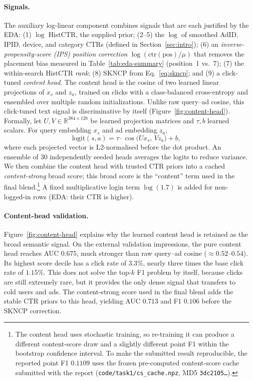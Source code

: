 \documentclass[sigconf, nonacm]{acmart}
\begin{document}
\paragraph{Signals.}
The auxiliary log-linear component combines signals that are each justified by
the EDA: (1) $\log$ HistCTR, the supplied prior; (2--5) the
$\log$ of smoothed AdID, IPID, device, and category CTRs (defined in
Section~\ref{sec:intro}); (6) an \emph{inverse-propensity-score (IPS) position correction}
$\log(\mathrm{ctr}(\text{pos})/\mu)$ that removes the placement bias measured in
Table~\ref{tab:eda-summary} (position~1 vs.\ 7); (7) the within-search HistCTR
\emph{rank}; (8) SKNCP from Eq.~\eqref{eq:skncp}; and (9) a click-tuned
\emph{content head}. The content head is the cosine of two learned linear
projections of $x_s$ and $z_a$, trained on clicks with a class-balanced
cross-entropy and ensembled over multiple random initializations. Unlike raw
query--ad cosine, this click-tuned text signal is discriminative by itself
(Figure~\ref{fig:content-head}).
Formally, let $U,V\in\mathbb{R}^{384\times128}$ be learned projection matrices
and $\tau,b$ learned scalars. For query embedding $x_s$ and ad embedding $z_a$,
\begin{equation}
  \mathrm{logit}(s,a)=\tau\cdot\cos\!\bigl(Ux_s,\,Vz_a\bigr)+b,
  \label{eq:content}
\end{equation}
where each projected vector is L2-normalised before the dot product.
An ensemble of 30 independently seeded heads averages the logits to reduce
variance. We then combine the content head with trusted
CTR priors into a cached \emph{content-strong} broad score; this broad score is
the ``content'' term used in the final blend.\footnote{The content head uses
  stochastic training, so re-training it can produce a different content-score
  draw and a slightly different point F1 within the bootstrap confidence
  interval.  To make the submitted result reproducible, the reported point F1
  $0.1109$ uses the frozen pre-computed content-score cache submitted with the
  report (\texttt{code/task1/cs\_cache.npz}, MD5
  \texttt{3dc2105\ldots}).} A fixed multiplicative login term
$\log(1.7)$ is added for non-logged-in rows (EDA: their CTR is higher).

\paragraph{Content-head validation.}
Figure~\ref{fig:content-head} explains why the learned content head is retained
as the broad semantic signal. On the external validation impressions, the pure
content head reaches AUC $0.675$, much stronger than raw query--ad cosine
($\approx0.52$--$0.54$). Its highest score decile has a click rate of $3.3\%$,
nearly three times the base click rate of $1.15\%$. This does not solve the
top-$k$ F1 problem by itself, because clicks are still extremely rare, but it
provides the only dense signal that transfers to cold users and ads. The
content-strong score used in the final blend adds the stable CTR priors to this
head, yielding AUC $0.713$ and F1 $0.106$ before the SKNCP correction.
\end{document}
